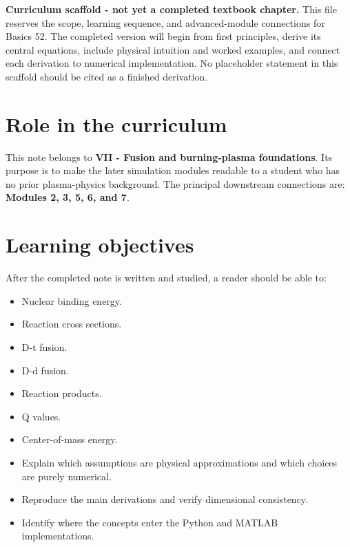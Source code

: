 \documentclass[11pt]{article}
\begin{document}

\begin{overviewbox}
\textbf{Curriculum scaffold - not yet a completed textbook chapter.} This file reserves the scope, learning sequence, and advanced-module connections for Basics 52. The completed version will begin from first principles, derive its central equations, include physical intuition and worked examples, and connect each derivation to numerical implementation. No placeholder statement in this scaffold should be cited as a finished derivation.
\end{overviewbox}

\ProjectTOC

\section{Role in the curriculum}
This note belongs to \textbf{VII - Fusion and burning-plasma foundations}. Its purpose is to make the later simulation modules readable to a student who has no prior plasma-physics background. The principal downstream connections are: \textbf{Modules 2, 3, 5, 6, and 7}.

\section{Learning objectives}
After the completed note is written and studied, a reader should be able to:
\begin{itemize}[leftmargin=1.6em]
\item Nuclear binding energy.
\item Reaction cross sections.
\item D-t fusion.
\item D-d fusion.
\item Reaction products.
\item Q values.
\item Center-of-mass energy.
\item Explain which assumptions are physical approximations and which choices are purely numerical.
\item Reproduce the main derivations and verify dimensional consistency.
\item Identify where the concepts enter the Python and MATLAB implementations.
\end{itemize}
\end{document}
